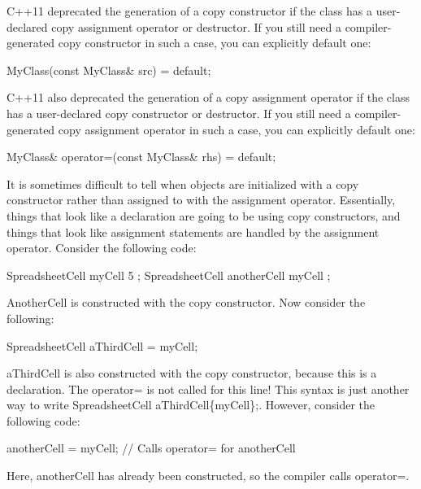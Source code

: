 
C++11 deprecated the generation of a copy constructor if the class has a user-declared copy assignment operator or destructor. If you still need a compiler-generated copy constructor in such a case, you can explicitly default one:

\begin{cpp}
MyClass(const MyClass& src) = default;
\end{cpp}

C++11 also deprecated the generation of a copy assignment operator if the class has a user-declared copy constructor or destructor. If you still need a compiler-generated copy assignment operator in such a case, you can explicitly default one:

\begin{cpp}
MyClass& operator=(const MyClass& rhs) = default;
\end{cpp}


It is sometimes difficult to tell when objects are initialized with a copy constructor rather than assigned to with the assignment operator. Essentially, things that look like a declaration are going to be using copy constructors, and things that look like assignment statements are handled by the assignment operator. Consider the following code:

\begin{cpp}
SpreadsheetCell myCell { 5 };
SpreadsheetCell anotherCell { myCell };
\end{cpp}

AnotherCell is constructed with the copy constructor. Now consider the following:

\begin{cpp}
SpreadsheetCell aThirdCell = myCell;
\end{cpp}

aThirdCell is also constructed with the copy constructor, because this is a declaration. The operator= is not called for this line! This syntax is just another way to write SpreadsheetCell aThirdCell\{myCell\};. However, consider the following code:

\begin{cpp}
anotherCell = myCell; // Calls operator= for anotherCell
\end{cpp}

Here, anotherCell has already been constructed, so the compiler calls operator=.

